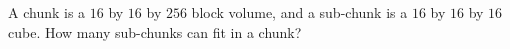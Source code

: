 A chunk is a $16$ by $16$ by $256$ block volume, and a sub-chunk is a $16$ by $16$ by $16$ cube. How many sub-chunks can fit in a chunk?
